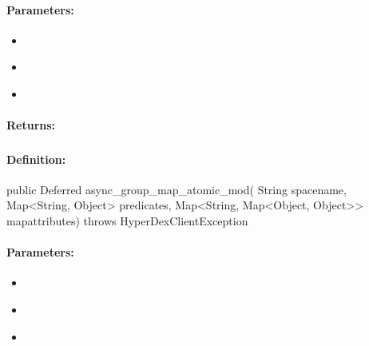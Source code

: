 \paragraph{Parameters:}
\begin{itemize}[noitemsep]
\item {}\\

\item {}\\

\item {}\\

\end{itemize}

\paragraph{Returns:}


\pagebreak
\subsubsection{}
\label{api:java:async_group_map_atomic_mod}


\paragraph{Definition:}
\begin{javacode}
public Deferred async_group_map_atomic_mod(
        String spacename,
        Map<String, Object> predicates,
        Map<String, Map<Object, Object>> mapattributes) throws HyperDexClientException
\end{javacode}

\paragraph{Parameters:}
\begin{itemize}[noitemsep]
\item {}\\

\item {}\\

\item {}\\

\end{itemize}

